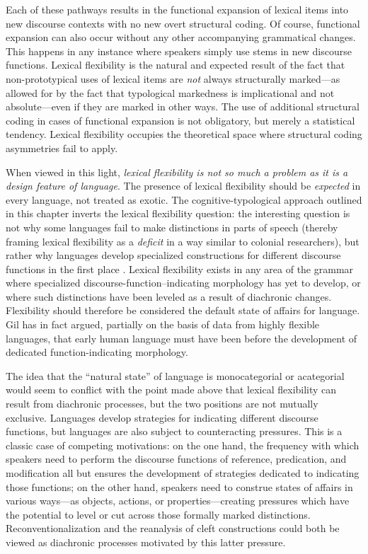 Each of these pathways results in the functional expansion of lexical items into new discourse contexts with no new overt structural coding. Of course, functional expansion can also occur without any other accompanying grammatical changes. This happens in any instance where speakers simply use stems in new discourse functions. Lexical flexibility is the natural and expected result of the fact that non-prototypical uses of lexical items are \emph{not} always structurally marked—as allowed for by the fact that typological markedness is implicational and not absolute—even if they are marked in other ways. The use of additional structural coding in cases of functional expansion is not obligatory, but merely a statistical tendency. Lexical flexibility occupies the theoretical space where structural coding asymmetries fail to apply.

When viewed in this light, \emph{lexical flexibility is not so much a problem as it is a design feature of language}. The presence of lexical flexibility should be \emph{expected} in every language, not treated as exotic. The cognitive-typological approach outlined in this chapter inverts the lexical flexibility question: the interesting question is not why some languages fail to make distinctions in parts of speech (thereby framing lexical flexibility as a \emph{deficit} in a way similar to colonial researchers), but rather why languages develop specialized constructions for different discourse functions in the first place . Lexical flexibility exists in any area of the grammar where specialized discourse-function–indicating morphology has yet to develop, or where such distinctions have been leveled as a result of diachronic changes. Flexibility should therefore be considered the default state of affairs for language. Gil \parencites*{Gil2005}{Gil2006} has in fact argued, partially on the basis of data from highly flexible languages, that early human language must have been  before the development of dedicated function-indicating morphology.

The idea that the \enquote{natural state} of language is monocategorial or acategorial would seem to conflict with the point made above that lexical flexibility can result from diachronic processes, but the two positions are not mutually exclusive. Languages develop strategies for indicating different discourse functions, but languages are also subject to counteracting pressures. This is a classic case of competing motivations: on the one hand, the frequency with which speakers need to perform the discourse functions of reference, predication, and modification all but ensures the development of strategies dedicated to indicating those functions; on the other hand, speakers need to construe states of affairs in various ways—as objects, actions, or properties—creating pressures which have the potential to level or cut across those formally marked distinctions. Reconventionalization and the reanalysis of cleft constructions could both be viewed as diachronic processes motivated by this latter pressure.

